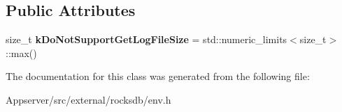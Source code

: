 \subsection*{Public Attributes}
\begin{DoxyCompactItemize}
\item 
size\+\_\+t {\bfseries k\+Do\+Not\+Support\+Get\+Log\+File\+Size} = std\+::numeric\+\_\+limits$<$size\+\_\+t$>$\+::max()\hypertarget{classrocksdb_1_1Logger_af3dc2aa3d30220d12e2bcff70be6b2b0}{}\label{classrocksdb_1_1Logger_af3dc2aa3d30220d12e2bcff70be6b2b0}

\end{DoxyCompactItemize}


The documentation for this class was generated from the following file\+:\begin{DoxyCompactItemize}
\item 
Appserver/src/external/rocksdb/env.\+h\end{DoxyCompactItemize}
